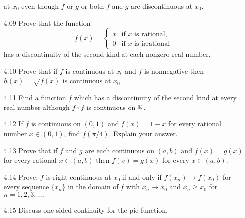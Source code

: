 \begin{enumerate}
               at $x_0$ even though $f$ or $g$ or both $f$ and $g$ are
               discontinuous at $x_0$.
   \item[4.09] Prove that the function
               \begin{equation*}
                  f(x) = \begin{cases}
                     x  & \text{if $x$ is rational}, \\
                     0  & \text{if $x$ is irrational}
                  \end{cases}
               \end{equation*}
               has a discontinuity of the second kind at each nonzero real
               number.
   \item[4.10] Prove that if $f$ is continuous at $x_0$ and $f$ is nonnegative
               then $h(x) = \sqrt{f(x)}$ is continuous at $x_0$.
   \item[4.11] Find a function $f$ which has a discontinuity of the second kind
               at every real number although $f \circ f$ is continuous on $\mathbb{R}$.
   \item[4.12] If $f$ is continuous on $(0, 1)$ and $f(x) = 1 - x$ for every
               rational number $x \in (0, 1)$, find $f(\pi/4)$. Explain your
               answer.
   \item[4.13] Prove that if $f$ and $g$ are each continuous on $(a, b)$ and
               $f(x) = g(x)$ for every rational $x \in (a, b)$ then
               $f(x) = g(x)$ for every $x \in (a, b)$.
   \item[4.14] Prove: $f$ is right-continuous at $x_0$ if and only if
               $f(x_n) \rightarrow f(x_0)$ for every sequence $\{x_n\}$ in the
               domain of $f$ with $x_n \rightarrow x_0$ and $x_n \ge x_0$ for
               $n = 1, 2, 3, ....$
   \item[4.15] Discuss one-sided continuity for the pie function.

\end{enumerate}
